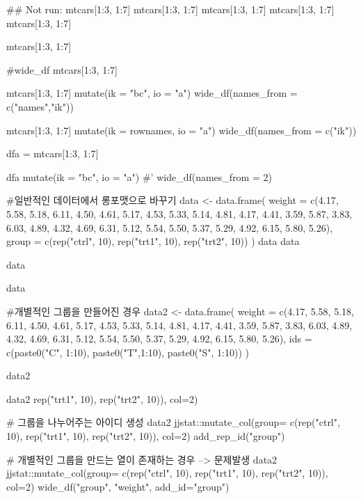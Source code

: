 \documentclass[a4paper]{book}
\begin{document}
\begin{Examples}
\begin{ExampleCode}

\#\# Not run: 
mtcars[1:3, 1:7]
mtcars[1:3, 1:7] %
mtcars[1:3, 1:7] %
mtcars[1:3, 1:7] %
mtcars[1:3, 1:7] %

mtcars[1:3, 1:7] %

#wide_df
mtcars[1:3, 1:7] %

mtcars[1:3, 1:7] %
  mutate(ik = "bc", io = "a")%
  wide_df(names_from = c("names","ik"))


mtcars[1:3, 1:7] %
  mutate(ik = rownames, io = "a")%
  wide_df(names_from = c("ik"))%

dfa = mtcars[1:3, 1:7] %

dfa%
  mutate(ik = "bc", io = "a")%
#'   wide_df(names_from = 2)


#일반적인 데이터에서  롱포맷으로 바꾸기
data <- data.frame(
  weight = c(4.17, 5.58, 5.18, 6.11, 4.50, 4.61, 5.17, 4.53, 5.33, 5.14,
             4.81, 4.17, 4.41, 3.59, 5.87, 3.83, 6.03, 4.89, 4.32, 4.69,
             6.31, 5.12, 5.54, 5.50, 5.37, 5.29, 4.92, 6.15, 5.80, 5.26),
  group = c(rep("ctrl", 10), rep("trt1", 10), rep("trt2", 10))
)
data
data%

data%

data  %


#개별적인 그룹을 만들어진 경우
data2 <- data.frame(
  weight = c(4.17, 5.58, 5.18, 6.11, 4.50, 4.61, 5.17, 4.53, 5.33, 5.14,
             4.81, 4.17, 4.41, 3.59, 5.87, 3.83, 6.03, 4.89, 4.32, 4.69,
             6.31, 5.12, 5.54, 5.50, 5.37, 5.29, 4.92, 6.15, 5.80, 5.26),
  ids = c(paste0("C", 1:10), paste0("T",1:10), paste0("S", 1:10))
)

data2

data2 %
                 rep("trt1", 10), rep("trt2", 10)), col=2)

# 그룹을 나누어주는 아이디 생성
data2 %
jjstat::mutate_col(group= c(rep("ctrl", 10),
        rep("trt1", 10), rep("trt2", 10)), col=2)%
        add_rep_id("group")

# 개별적인 그룹을 만드는 열이 존재하는 경우 --> 문제발생
data2 %
    jjstat::mutate_col(group= c(rep("ctrl", 10),
          rep("trt1", 10), rep("trt2", 10)), col=2)%
          wide_df("group", "weight", add_id="group")


\end{ExampleCode}
\end{Examples}
\end{document}
